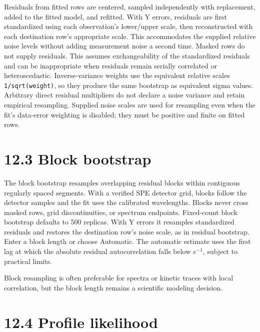 \documentclass[
  10pt,
  a4paper,
  oneside]{scrreprt}
\begin{document}
Residuals from fitted rows are centered, sampled independently with
replacement, added to the fitted model, and refitted. With Y errors,
residuals are first standardized using each observation's lower/upper
scale, then reconstructed with each destination row's appropriate scale.
This accommodates the supplied relative noise levels without adding
measurement noise a second time. Masked rows do not supply residuals.
This assumes exchangeability of the standardized residuals and can be
inappropriate when residuals remain serially correlated or
heteroscedastic. Inverse-variance weights use the equivalent relative
scales \texttt{1/sqrt(weight)}, so they produce the same bootstrap as
equivalent sigma values. Arbitrary direct residual multipliers do not
declare a noise variance and retain empirical resampling. Supplied noise
scales are used for resampling even when the fit's data-error weighting
is disabled; they must be positive and finite on fitted rows.

\hypertarget{block-bootstrap}{%
\section{12.3 Block bootstrap}\label{block-bootstrap}}

The block bootstrap resamples overlapping residual blocks within
contiguous regularly spaced segments. With a verified SPE detector grid,
blocks follow the detector samples and the fit uses the calibrated
wavelengths. Blocks never cross masked rows, grid discontinuities, or
spectrum endpoints. Fixed-count block bootstrap defaults to 500
replicas. With Y errors it resamples standardized residuals and restores
the destination row's noise scale, as in residual bootstrap. Enter a
block length or choose Automatic. The automatic estimate uses the first
lag at which the absolute residual autocorrelation falls below
\(e^{-1}\), subject to practical limits.

Block resampling is often preferable for spectra or kinetic traces with
local correlation, but the block length remains a scientific modeling
decision.

\hypertarget{profile-likelihood}{%
\section{12.4 Profile likelihood}\label{profile-likelihood}}
\end{document}
